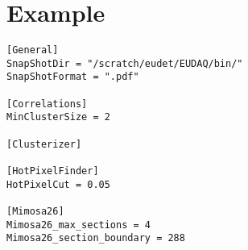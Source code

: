 \documentclass{article}
\begin{document}
\section{Example}
\begin{verbatim}
[General]
SnapShotDir = "/scratch/eudet/EUDAQ/bin/"
SnapShotFormat = ".pdf"

[Correlations]
MinClusterSize = 2

[Clusterizer]

[HotPixelFinder]
HotPixelCut = 0.05

[Mimosa26]
Mimosa26_max_sections = 4 
Mimosa26_section_boundary = 288
\end{verbatim}
\end{document}
